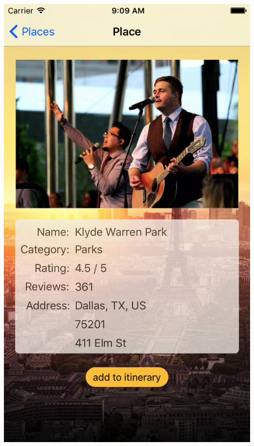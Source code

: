 \documentclass{beamer}
\begin{document}
\begin{frame}
\begin{columns}
\begin{column}{0.3\textwidth}
\begin{center}
            \includegraphics[scale=0.14]{placesDetail}
        \end{center}
    \end{column}
\end{columns}
\end{frame}
\end{document}
